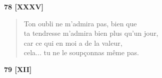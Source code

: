 \bigskip

\begin{center}
  \textbf{78 [XXXV]}
\end{center}


\begin{verse}
  Ton oubli ne m'admira pas, bien que \\
  ta tendresse m'admira bien plus qu'un jour, \\
  car ce qui en moi a de la valeur, \\
  cela... tu ne le soupçonnas même pas.
\end{verse}

\bigskip

\begin{center}
  \textbf{79 [XII]}
\end{center}


